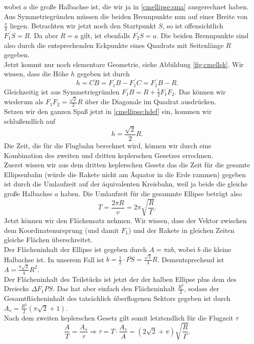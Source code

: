 \begin{Answer}[ref = cmellipse]
	wobei $a$ die große Halbachse ist, die wir ja in \eqref{cmellipse:sma} ausgerechnet haben.\\
	Aus Symmetriegründen müssen die beiden Brennpunkte nun auf einer Breite von $\frac{\pi}{4}$ liegen. Betrachten wir jetzt noch den Startpunkt $S$, so ist offensichtlich $\overline{F_1S}= R$. Da aber $R=a$ gilt, ist ebenfalls $\overline{F_2S} = a$. Die beiden Brennpunkte sind also durch die entsprechenden Eckpunkte eines Quadrats mit Seitenlänge $R$  gegeben.\\
	Jetzt kommt nur noch elementare Geometrie, siehe Abbildung \ref{fig:cmellsk}. Wir wissen, dass die Höhe $h$ gegeben ist durch 
	\begin{equation}\label{cmellipse:hdef}
		h = \overline{CB} = \overline{F_1B} - \overline{F_1C} =  \overline{F_1B} - R.
	\end{equation}
	Gleichzeitig ist aus Symmetriegründen $\overline{F_1B} = R + \frac{1}{2}\overline{F_1F_2}$. Das können wir wiederum als $\overline{F_1F_2} = \frac{\sqrt{2}}{2}R$ über die Diagonale im Quadrat ausdrücken.\\
	Setzen wir den ganzen Spaß jetzt in \eqref{cmellipse:hdef} ein, kommen wir schlußendlich auf
	\begin{equation}\label{cmellipse:maxh}
		\boxed{h = \frac{\sqrt{2}}{2}R.}
	\end{equation}
	\Question Die Zeit, die für die Flugbahn berechnet wird, können wir durch eine Kombination des zweiten und dritten keplerschen Gesetzes errechnen. \\
	Zuerst wissen wir aus dem dritten keplerschen Gesetz das die Zeit für die gesamte Ellipsenbahn (würde die Rakete nicht am Äquator in die Erde rammen) gegeben ist durch die Umlaufzeit auf der äquivalenten Kreisbahn, weil ja beide die gleiche große Halbachse $a$ haben. Die Umlaufzeit für die gesammte Ellipse beträgt also
	\begin{equation}\label{cmellipse:tfull}
		T = \frac{2\pi R}{v} = 2\pi \sqrt{\frac{R}{{\Gamma}}}.
	\end{equation}
	Jetzt können wir den Flächensatz nehmen. Wir wissen, dass der Vektor zwischen dem Koordinatenursprung (und damit $F_1$) und der Rakete in gleichen Zeiten gleiche Flächen überschreitet.\\
	Der Flächeninhalt der Ellipse ist gegeben durch $A = \pi ab$, wobei $b$ die kleine Halbachse ist. In unserem Fall ist $b = \frac{1}{2}\cdot \overline{PS}  = \frac{\sqrt{2}}{4}R$. Dementsprechend ist $A = \frac{\pi\sqrt{2}}{4}R^2$.\\
	Der Flächeninhalt des Teilstücks ist jetzt der der halben Ellipse plus dem des Dreiecks $\Delta F_1PS$. Das hat aber einfach den Flächeninhalt $\frac{R^2}{2}$, sodass der Gesamtflächeninhalt des tatsächlich überflogenen Sektors gegeben ist durch $A_s = \frac{R^2}{2}\left(\pi \sqrt{2} + 1\right)$.\\
	Nach dem zweiten keplerschen Gesetz gilt somit letztendlich für die Flugzeit $\tau$
	\begin{equation}
		\boxed{\frac{A}{T} = \frac{A_s}{\tau} \Rightarrow \tau = T\cdot \frac{A_s}{A} = \left(2\sqrt{2}+ \pi\right) \sqrt{\frac{R}{\Gamma}}.}
	\end{equation}
\end{Answer}